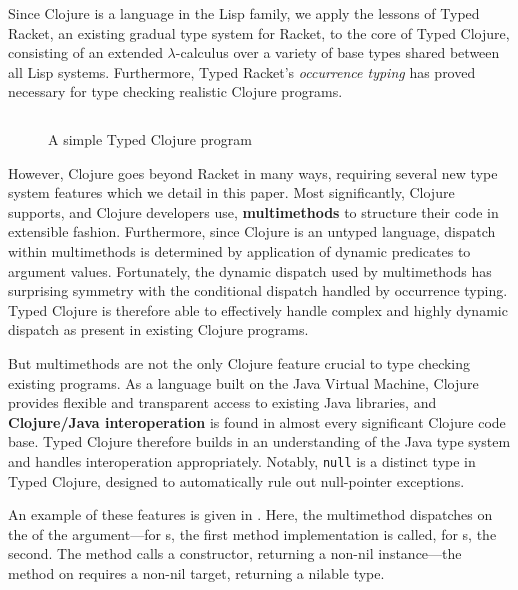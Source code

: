 Since Clojure is a language in the
Lisp family, we apply the lessons of Typed Racket, an existing gradual type
system for Racket, to the core of Typed Clojure, consisting of an extended
$\lambda$-calculus over a variety of base types shared between all Lisp systems.
%
Furthermore, Typed Racket's \emph{occurrence typing} has proved
necessary for type checking realistic Clojure programs.

\begin{figure}[t!]
\inputminted[firstline=15]{clojure}{code/demo/src/demo/ex-intro.clj}
\caption{A simple Typed Clojure program}
\label{fig:ex1}
\end{figure}


However, Clojure goes beyond Racket in many ways, requiring several
new type system features which we detail in this paper.
%
Most significantly, Clojure supports, and Clojure developers use,
\textbf{multimethods} to structure their code in extensible
fashion. Furthermore, since Clojure is an untyped language, dispatch
within multimethods is determined by application of dynamic predicates
to argument values. 
%
Fortunately, the dynamic dispatch used by multimethods has surprising
symmetry with the conditional dispatch handled by occurrence
typing. Typed Clojure is therefore able to effectively handle complex
and highly dynamic dispatch as present in existing Clojure programs. 

But multimethods are not the only Clojure feature crucial to type
checking existing programs. As a language built on the Java Virtual
Machine, Clojure provides flexible and transparent access to existing
Java libraries, and \textbf{Clojure/Java interoperation} is found in almost
every significant Clojure code base. Typed Clojure therefore builds in
an understanding of the Java type system and handles interoperation
appropriately. Notably, \texttt{null} is a distinct type in Typed Clojure,
designed to automatically rule out null-pointer exceptions.

An example of these features is given in
. Here, the  multimethod dispatches
on the  of the argument---for s,
the first method implementation is called, for s, the
second. The  method calls
a  constructor, returning a non-nil  instance---the 
 method 
on  requires a non-nil target, returning a nilable
type.  

